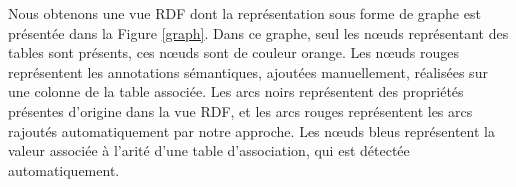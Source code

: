 




Nous obtenons 
une vue RDF dont la représentation sous forme de graphe est présentée dans la Figure \ref{graph}. Dans ce graphe, seul les n\oe  uds représentant des tables sont présents, ces n\oe  uds sont de couleur orange. Les n\oe  uds rouges représentent les annotations sémantiques, ajoutées manuellement, réalisées sur une colonne de la table associée. Les arcs noirs représentent des propriétés présentes d’origine dans la vue RDF, et les arcs rouges représentent les arcs rajoutés automatiquement par notre approche. Les n\oe  uds bleus représentent la valeur associée à l’arité d’une table d’association, qui est détectée automatiquement. 

